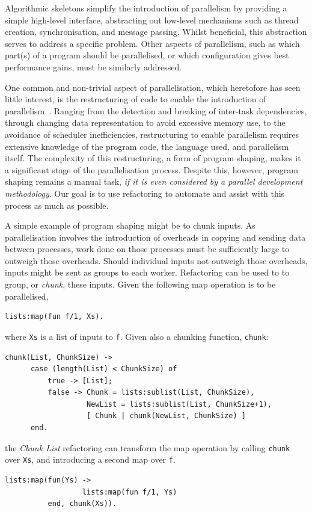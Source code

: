 \documentclass[final]{jfp1}
\begin{document}
Algorithmic skeletons simplify the introduction of parallelism
by providing a simple high-level interface, abstracting out low-level mechanisms
such as thread creation, synchronisation, and message passing. Whilst
beneficial, this abstraction serves to address a specific problem. Other aspects
of parallelism, such as which part(s) of a program should be parallelised, or
which configuration gives best performance gains, must be similarly addressed.

One common and non-trivial aspect of parallelisation, which heretofore has seen
little interest, is the restructuring of code to enable the introduction of
parallelism~\cite{DBLP:journals/cai/BarwellBHTB16}. Ranging from the detection and breaking of inter-task dependencies,
through changing data representation to avoid excessive memory use, to the
avoidance of scheduler inefficiencies, restructuring to enable parallelism
requires extensive knowledge of the program code, the language used, and
parallelism itself. The complexity of this restructuring, a form of program
shaping, makes it a significant stage of the parallelisation process. Despite
this, however, program shaping remains a manual task, \emph{if it is even
  considered by a parallel development methodology}. Our goal is to use
refactoring to automate and assist with this process as much as possible.

A simple example of program shaping might be to chunk inputs. As
parallelisation involves the introduction of overheads in copying and sending
data between processes, work done on those processes must be sufficiently     large
to outweigh those overheads. Should individual inputs not outweigh those
overheads, inputs might be sent as groups to each worker. Refactoring can be
used to to group, or \emph{chunk}, these inputs. Given the following map
operation is to be parallelised,
% 
\begin{lstlisting}
lists:map(fun f/1, Xs).
\end{lstlisting}
% 
\noindent
where \lstinline|Xs| is a list of inputs to \lstinline|f|. Given also a chunking
function, \lstinline|chunk|:
% 
\begin{lstlisting}
chunk(List, ChunkSize) ->
      case (length(List) < ChunkSize) of
          true -> [List];            
          false -> Chunk = lists:sublist(List, ChunkSize),
                   NewList = lists:sublist(List, ChunkSize+1),
                   [ Chunk | chunk(NewList, ChunkSize) ]
      end.
\end{lstlisting}
% 
\noindent
the \emph{Chunk List} refactoring can transform the map operation by calling
\lstinline|chunk| over \lstinline|Xs|, and introducing a second map over
\lstinline|f|.
%
\begin{lstlisting}
lists:map(fun(Ys) ->
                  lists:map(fun f/1, Ys)
          end, chunk(Xs)).
\end{lstlisting}
\end{document}
